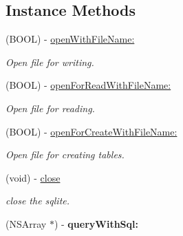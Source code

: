 \subsection*{Instance Methods}
\begin{DoxyCompactItemize}
\item 
\mbox{\label{interface_n_f_l_o_g_sqlite_ab1dcb5309f55e038b101ce2037240091}} 
(B\+O\+OL) -\/ \hyperlink{interface_n_f_l_o_g_sqlite_ab1dcb5309f55e038b101ce2037240091}{open\+With\+File\+Name\+:}
\begin{DoxyCompactList}\small\item\em Open file for writing. \end{DoxyCompactList}\item 
\mbox{\label{interface_n_f_l_o_g_sqlite_a30e962e6a3ee86dbb3d64e07991fc08b}} 
(B\+O\+OL) -\/ \hyperlink{interface_n_f_l_o_g_sqlite_a30e962e6a3ee86dbb3d64e07991fc08b}{open\+For\+Read\+With\+File\+Name\+:}
\begin{DoxyCompactList}\small\item\em Open file for reading. \end{DoxyCompactList}\item 
\mbox{\label{interface_n_f_l_o_g_sqlite_a16af0ec78bdb2f90d379ad206c0b7d7c}} 
(B\+O\+OL) -\/ \hyperlink{interface_n_f_l_o_g_sqlite_a16af0ec78bdb2f90d379ad206c0b7d7c}{open\+For\+Create\+With\+File\+Name\+:}
\begin{DoxyCompactList}\small\item\em Open file for creating tables. \end{DoxyCompactList}\item 
\mbox{\label{interface_n_f_l_o_g_sqlite_aac13ab1c1c0b79730cd884068e147161}} 
(void) -\/ \hyperlink{interface_n_f_l_o_g_sqlite_aac13ab1c1c0b79730cd884068e147161}{close}
\begin{DoxyCompactList}\small\item\em close the sqlite. \end{DoxyCompactList}\item 
\mbox{\label{interface_n_f_l_o_g_sqlite_a2829a0f007dede4527f7fe49b8dac075}} 
(N\+S\+Array $\ast$) -\/ {\bfseries query\+With\+Sql\+:}
\item 

\end{DoxyCompactItemize}
